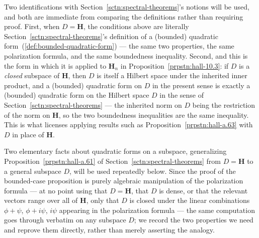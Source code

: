 \begin{definition}
    Two identifications with Section~\ref{sctn:spectral-theorems}'s notions will be used, and both are immediate from comparing the definitions rather than requiring proof. First, when $D = \mathbf{H}$, the conditions above are literally Section~\ref{sctn:spectral-theorems}'s definition of a (bounded) quadratic form~(\ref{def:bounded-quadratic-form}) — the same two properties, the same polarization formula, and the same boundedness inequality. Second, and this is the form in which it is applied to $\mathbf{H}_n$ in Proposition~\ref{prpstn:hall-10.3}: if $D$ is a \textit{closed} subspace of $\mathbf{H}$, then $D$ is itself a Hilbert space under the inherited inner product, and a (bounded) quadratic form on $D$ in the present sense is exactly a (bounded) quadratic form on the Hilbert space $D$ in the sense of Section~\ref{sctn:spectral-theorems} — the inherited norm on $D$ being the restriction of the norm on $\mathbf{H}$, so the two boundedness inequalities are the same inequality. This is what licenses applying results such as Proposition~\ref{prpstn:hall-a.63} with $D$ in place of $\mathbf{H}$.
\end{definition}

Two elementary facts about quadratic forms on a subspace, generalizing Proposition~\ref{prpstn:hall-a.61} of Section~\ref{sctn:spectral-theorems} from $D = \mathbf{H}$ to a general subspace $D$, will be used repeatedly below. Since the proof of the bounded-case proposition is purely algebraic manipulation of the polarization formula — at no point using that $D = \mathbf{H}$, that $D$ is dense, or that the relevant vectors range over all of $\mathbf{H}$, only that $D$ is closed under the linear combinations $\phi+\psi$, $\phi+i\psi$, $i\psi$ appearing in the polarization formula — the same computation goes through verbatim on any subspace $D$; we record the two properties we need and reprove them directly, rather than merely asserting the analogy.

